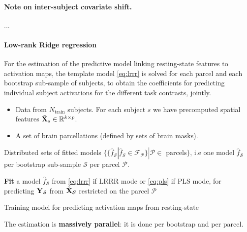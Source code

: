 \paragraph{Note on inter-subject covariate shift.}...

\paragraph{Low-rank Ridge regression}
For the estimation of the predictive model
linking resting-state features to activation maps, the template model
\eqref{eq:lrrr} is solved for each parcel and each bootstrap sub-sample of
subjects, to obtain the coefficients for predicting individual subject
activations for the different task contrasts, jointly.
%
\begin{algorithm}
  \begin{algorithmic}[1]
    \Require
    \begin{itemize}
    \item Data from $N_{\text{train}}$ subjects. For each subject $s$ we have
      precomputed spatial features $\tilde{\mathbf{X}}_s \in \mathbb R^{k \times p}$.
      
      
      \item A set of brain parcellations (defined by sets of brain masks).
      \end{itemize}
    \Ensure Distributed sets of fitted models $\{\{\hat{f}_{\mathcal S}|\hat{f}_{\mathcal S} \in
    \mathcal F_{\mathcal P}\} | \mathcal P \in \text{ parcels}\}$,
    i.e one model $\hat{f}_{\mathcal S}$ per bootstrap sub-sample  $\mathcal S$ per parcel
    $\mathcal P$.
  
  \State  \textbf{Fit} a model $\hat{f}_{\mathcal S}$ from \eqref{eq:lrrr} if
  LRRR mode or \eqref{eq:pls} if PLS mode, for predicting $\mathbf{Y}_{\mathcal S}$ from
  $\tilde{\mathbf{X}}_{\mathcal S}$ restricted on the parcel $\mathcal P$
\EndParFor

\EndParFor
\end{algorithmic}
\caption{Training model for predicting activation maps from resting-state}
\label{Tab:algfit}
\end{algorithm}
The estimation is \textbf{massively parallel}:
it is done per bootstrap and per parcel.


